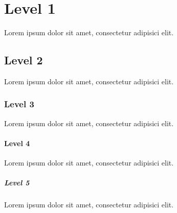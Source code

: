\documentclass[ngerman]{article}
\begin{document}
\thispagestyle{empty}
\section{Level 1}
Lorem ipsum dolor sit amet, consectetur adipisici elit.
\subsection{Level 2}
Lorem ipsum dolor sit amet, consectetur adipisici elit.
\subsubsection{Level 3}
Lorem ipsum dolor sit amet, consectetur adipisici elit.
\paragraph{Level 4}
Lorem ipsum dolor sit amet, consectetur adipisici elit.
\subparagraph{Level 5}
Lorem ipsum dolor sit amet, consectetur adipisici elit.
\end{document}
